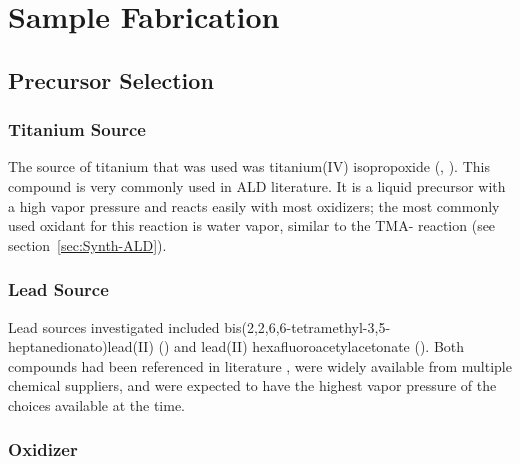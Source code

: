 \chapter{Sample Fabrication}
\label{ch:SampFab}
\thispagestyle{empty}



\section{Precursor Selection}
\label{sec:SampFab-Precursor}

\lipsum

\subsection{Titanium Source}

The source of titanium that was used was titanium(IV) isopropoxide (\TiOiPr{}, ). This compound is very commonly used in ALD literature. It is a liquid precursor with a high vapor pressure and reacts easily with most oxidizers; the most commonly used oxidant for this reaction is water vapor, similar to the TMA- reaction (see section~\vref{sec:Synth-ALD}).  

\subsection{Lead Source}

Lead sources investigated included bis(2,2,6,6-tetramethyl-3,5-heptanedionato)lead(II) () and lead(II) hexafluoroacetylacetonate (). Both compounds had been referenced in literature , were widely available from multiple chemical suppliers, and were expected to have the highest vapor pressure of the choices available at the time. 



\subsection{Oxidizer}

\lipsum


